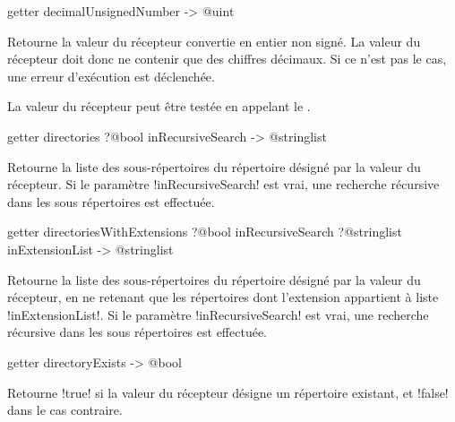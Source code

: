 
\begin{galgasbox}
getter decimalUnsignedNumber -> @uint
\end{galgasbox}

Retourne la valeur du récepteur convertie en entier non signé. La valeur du récepteur doit donc ne contenir que des chiffres décimaux. Si ce n'est pas le cas, une erreur d'exécution est déclenchée.

La valeur du récepteur peut être testée en appelant le .









\begin{galgasbox}
getter directories ?@bool inRecursiveSearch -> @stringlist
\end{galgasbox}

Retourne la liste des sous-répertoires du répertoire désigné par la valeur du récepteur. Si le paramètre \ggs!inRecursiveSearch! est vrai, une recherche récursive dans les sous répertoires est effectuée.










\begin{galgasbox}
getter directoriesWithExtensions
    ?@bool inRecursiveSearch
    ?@stringlist inExtensionList -> @stringlist
\end{galgasbox}

Retourne la liste des sous-répertoires du répertoire désigné par la valeur du récepteur, en ne retenant que les répertoires dont l'extension appartient à liste \ggs!inExtensionList!. Si le paramètre \ggs!inRecursiveSearch! est vrai, une recherche récursive dans les sous répertoires est effectuée.









\begin{galgasbox}
getter directoryExists -> @bool
\end{galgasbox}

Retourne \ggs!true! si la valeur du récepteur désigne un répertoire existant, et \ggs!false! dans le cas contraire.








